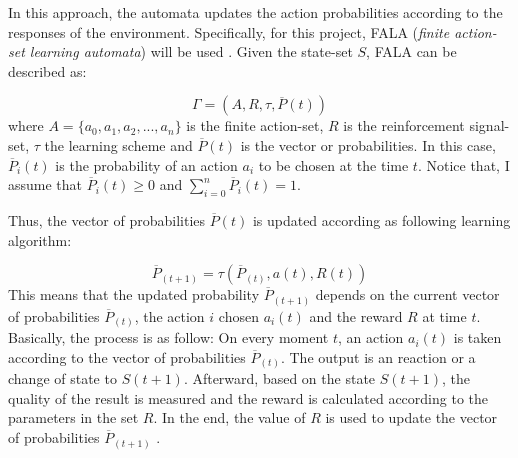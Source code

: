 In this approach, the automata updates the action probabilities according to the responses of the environment. Specifically, for this project, FALA (\emph{finite action-set learning automata}) will be used \cite{Narendra:1989}. Given the state-set $S$, FALA can be described as:

\begin{equation}
\label{eq: FALA}
\Gamma = (A,R,\tau,\overline{P}(t))
\end{equation}
where $A = \{a_0,a_1,a_2,...,a_n\}$ is the finite action-set, $R$ is the reinforcement signal-set, $\tau$ the learning scheme and $\overline{P}(t)$ is the vector or probabilities. In this case, $\overline{P}_{i}(t)$ is the probability of an action $a_i$ to be chosen at the time $t$. Notice that, I assume that $\overline{P}_{i}(t) \geq 0$ and $\sum_{i=0}^{n} \overline{P}_{i}(t) = 1$.

Thus, the vector of probabilities $\overline{P}(t)$ is updated according as following learning algorithm:

\begin{equation}
\label{eq: updateFALA}
\overline{P}_{(t+1)} = \tau(\overline{P}_{(t)},a(t),R(t))
\end{equation}
This means that the updated probability $\overline{P}_{(t+1)}$ depends on the current vector of probabilities $\overline{P}_{(t)}$, the action $i$ chosen $a_{i}(t)$ and the reward $R$ at time $t$. Basically, the process is as follow: On every moment $t$, an action $a_{i}(t)$ is taken according to the vector of probabilities $\overline{P}_{(t)}$. The output is an reaction or a change of state to $S(t+1)$. Afterward, based on the state $S(t+1)$, the quality of the result is measured and the reward is calculated according to the parameters in the set $R$. In the end, the value of $R$ is used to update the vector of probabilities $\overline{P}_{(t+1)}$ \cite{Narendra:1989}. 